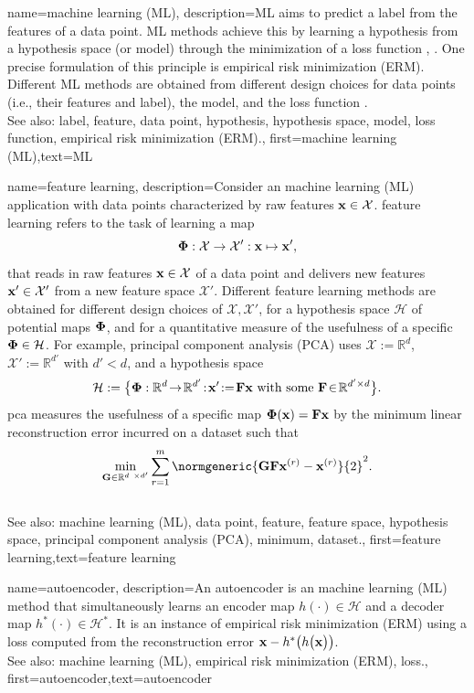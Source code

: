 {name={machine learning (ML)},
		 description={ML aims to predict 
	 a label from the features of a data point. ML methods achieve 
	 this by learning a hypothesis from a hypothesis space (or model) 
	 through the minimization of a loss function \cite{MLBasics}, \cite{HastieWainwrightBook}. 
	 One precise formulation of this principle is empirical risk minimization (ERM). Different ML methods are 
	 obtained from different design choices for data points (i.e., their features and label), 
	 the model, and the loss function \cite[Ch. 3]{MLBasics}.
	 			\\ 
		See also: label, feature, data point, hypothesis, hypothesis space, model, loss function, empirical risk minimization (ERM).},
	first={machine learning (ML)},text={ML}
} 


{name={feature learning},
	description={Consider an machine learning (ML) application with data points characterized by 
		raw features ${\bf x} \in \mathcal{X}$. \Gls{feature} learning 
		refers to the task of learning a map 
		$${\bf \Phi}: \mathcal{X} \rightarrow \mathcal{X}': {\bf x} \mapsto {\bf x}',$$ 
		that reads in raw features ${\bf x} \in \mathcal{X}$ of a data point and delivers new 
		features ${\bf x}' \in \mathcal{X}'$ from a new feature space $\mathcal{X}'$. 
		Different feature learning methods are obtained for different design 
		choices of $\mathcal{X},\mathcal{X}'$, for a hypothesis space $\mathcal{H}$ 
		of potential maps ${\bf \Phi}$, and for a quantitative measure of the usefulness of 
		a specific ${\bf \Phi} \in \mathcal{H}$. For example, principal component analysis (PCA) 
		uses $\mathcal{X} := \mathbb{R}^{d}$, $\mathcal{X}' := \mathbb{R}^{d'}$ 
		with $d' < d$, and a hypothesis space 
		$$\mathcal{H}:= \big\{ {\bf \Phi}: \mathbb{R}^{d}
		\!\rightarrow\! \mathbb{R}^{d'}\!:\!{\bf x}'\!:=\!\mathbf{F} {\bf x} \mbox{ with some } \mathbf{F} \!\in\! \mathbb{R}^{d' \times d} \big\}.$$ \Gls{pca} measures the usefulness of a specific map ${\bf \Phi}({\bf x})= \mathbf{F} {\bf x}$ 
	by the minimum linear reconstruction error incurred on a dataset such that 
$$ \min_{\mathbf{G} \in \mathbb{R}^{d \times d'}} \sum_{r=1}^{m} \normgeneric{\mathbf{G} \mathbf{F} {\bf x}^{(r)} - {\bf x}^{(r)}}{2}^{2}.$$ 
			\\ 
		See also: machine learning (ML), data point, feature, feature space, hypothesis space, principal component analysis (PCA), minimum, dataset.}, 
	first={feature learning},text={feature learning}
} 

{name={autoencoder},
	description={An autoencoder is an machine learning (ML) method that simultaneously learns an encoder map 
		$h(\cdot) \in \mathcal{H}$ and a decoder map $h^{*}(\cdot) \in \mathcal{H}^{*}$. 
		It is an instance of empirical risk minimization (ERM) using a loss computed from the reconstruction error 
		${\bf x} - h^{*}\big(  h \big( {\bf x} \big) \big)$.
					\\ 
		See also: machine learning (ML), empirical risk minimization (ERM), loss.},
	first={autoencoder},text={autoencoder}
} 


